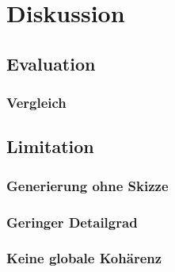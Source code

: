 \chapter{Diskussion}

\section{Evaluation}

\subsection{Vergleich}

\section{Limitation}

\subsection{Generierung ohne Skizze}

\subsection{Geringer Detailgrad}

\subsection{Keine globale Kohärenz}

